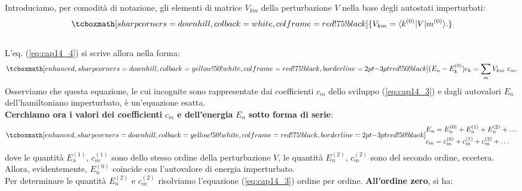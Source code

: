 \documentclass[a4paper,12pt,oneside]{book}
\begin{document}
Introduciamo, per comodità di notazione, gli elementi di matrice $V_{km}$ della perturbazione $V$ nella base degli autostati imperturbati:
	\begin{equation}
		\tcboxmath[sharp corners=downhill, colback=white, colframe=red!75!black]{
			V_{km} = \langle k^{(0)}\vert V\vert m^{(0)}\rangle.
			}
	\end{equation}\\
	
L'eq. (\ref{eq:cap14_4}) si scrive allora nella forma:
	\begin{equation}
		\tcboxmath[enhanced, sharp corners=downhill, colback=yellow!50!white, colframe=red!75!black, borderline={2pt}{-3pt}{red!50!black}]{	(E_n - E_k ^{(0)}) c_k = \sum _m V_{km}\ c_m .
		}
	\label{eq:cap14_5}
	\end{equation}
Osserviamo che questa equazione, le cui incognite sono rappresentate dai coefficienti $c_m$ dello sviluppo (\ref{eq:cap14_3}) e dagli autovalori $E_n$ dell'hamiltoniano imperturbato, è un'equazione esatta.\\

\textbf{Cerchiamo ora i valori dei coefficienti} $c_m$ \textbf{e dell'energia} $E_n$ \textbf{sotto forma di serie}:
	\begin{equation}
		\tcboxmath[enhanced, sharp corners=downhill, colback=yellow!50!white, colframe=red!75!black, borderline={2pt}{-3pt}{red!50!black}]{
		\begin{aligned}
			& E_n = E_n ^{(0)}+E_n ^{(1)}+E_n ^{(2)}+\dots  \\
			& c_m = c_m ^{(0)}+c_m ^{(1)}+c_m ^{(2)}+\dots
		\end{aligned}
		}
	\end{equation}
dove le quantità $E_n ^{(1)}$, $c_m ^{(1)}$ sono dello stesso ordine della perturbazione $V$, le quantità $E_n ^{(2)}$, $c_m ^{(2)}$ sono del secondo ordine, eccetera. Allora, evidentemente, $E_n ^{(0)}$ coincide con l'autovalore di energia imperturbato.\\

Per determinare le quantità $E_n ^{(2)}$ e $c_m ^{(2)}$ risolviamo l'equazione (\ref{eq:cap14_3}) ordine per ordine. \textbf{All'ordine zero}, si ha:\\
\end{document}
